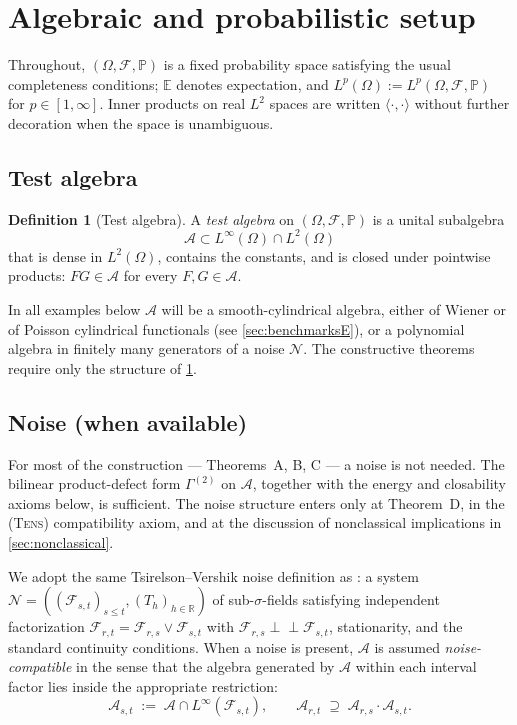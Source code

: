 \documentclass[11pt,reqno]{amsart}
\theoremstyle{plain}
\theoremstyle{definition}
\newtheorem{definition}[theorem]{Definition}
\theoremstyle{remark}
\newcommand{\R}{\mathbb{R}}
\newcommand{\E}{\mathbb{E}}
\newcommand{\Prob}{\mathbb{P}}
\newcommand{\cA}{\mathcal A}
\newcommand{\cF}{\mathcal F}
\newcommand{\cN}{\mathcal N}
\begin{document}
\section{Algebraic and probabilistic setup}\label{sec:setup}

Throughout, $(\Omega,\cF,\Prob)$ is a fixed probability space
satisfying the usual completeness conditions; $\E$ denotes
expectation, and $L^{p}(\Omega):=L^{p}(\Omega,\cF,\Prob)$ for
$p\in[1,\infty]$. Inner products on real $L^{2}$ spaces are
written $\langle\cdot,\cdot\rangle$ without further decoration when
the space is unambiguous.

\subsection{Test algebra}\label{sec:setup-algebra}

\begin{definition}[Test algebra]\label{def:test-algebra}
A \emph{test algebra} on $(\Omega,\cF,\Prob)$ is a unital subalgebra
\[
  \cA\subset L^{\infty}(\Omega)\cap L^{2}(\Omega)
\]
that is dense in $L^{2}(\Omega)$, contains the constants, and is
closed under pointwise products: $FG\in\cA$ for every
$F,G\in\cA$.
\end{definition}

In all examples below $\cA$ will be a smooth-cylindrical algebra,
either of Wiener or of Poisson cylindrical functionals (see
\cref{sec:benchmarksE}), or a polynomial algebra in finitely many
generators of a noise $\cN$. The constructive theorems require
only the structure of \cref{def:test-algebra}.

\subsection{Noise (when available)}\label{sec:setup-noise}

For most of the construction --- Theorems~A, B, C --- a noise is
not needed. The bilinear product-defect form $\Gamma^{(2)}$ on
$\cA$, together with the energy and closability axioms below, is
sufficient. The noise structure enters only at Theorem~D, in the
\textsc{(Tens)} compatibility axiom, and at the discussion of
nonclassical implications in \cref{sec:nonclassical}.

We adopt the same Tsirelson--Vershik noise definition as
\cite[Def.~2.4]{PrimitiveDivergence}: a system
$\cN=((\cF_{s,t})_{s\le t},(T_{h})_{h\in\R})$ of sub-$\sigma$-fields
satisfying independent factorization
$\cF_{r,t}=\cF_{r,s}\vee\cF_{s,t}$ with
$\cF_{r,s}\perp\!\!\!\perp\cF_{s,t}$, stationarity, and the standard
continuity conditions. When a noise is present, $\cA$ is assumed
\emph{noise-compatible} in the sense that the algebra generated by
$\cA$ within each interval factor lies inside the appropriate
restriction:
\[
  \cA_{s,t}\;:=\;\cA\cap L^{\infty}(\cF_{s,t}),
  \qquad
  \cA_{r,t}\;\supseteq\;\cA_{r,s}\cdot\cA_{s,t}.
\]
\end{document}
